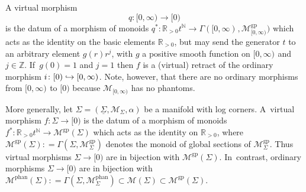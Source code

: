 \documentclass[10pt]{amsart}
\newcommand\hto{\mathrel{\lhook\joinrel\to}}
\theoremstyle{definition}
\theoremstyle{remark}
\newenvironment{example}
  {\pushQED{\qed}\renewcommand{\qedsymbol}{$\lozenge$}\examplex}
  {\popQED\endexamplex}
\newcommand{\RR}{\mathbb{R}}
\newcommand{\NN}{\mathbb{N}}
\newcommand{\ZZ}{\mathbb{Z}}
\newcommand{\halfspc}[1]{[0,\infty)^{#1}}
\newcommand{\defas}{\mathrel{\mathop:}=}
\newcommand{\cM}{\mathscr{M}}
\newcommand{\cMgp}{\mathscr{M}^{\mathrm{gp}}}
\newcommand{\cMphan}{\mathscr{M}^{\mathrm{phan}}}
\newcommand{\Sig}{\Sigma}
\newcommand{\uSig}{\underline{\Sigma}}
\newcommand{\sect}[1]{\mathsf{\Gamma}(#1)}
\begin{document}
\begin{example}\label{ex:weak-mor-retract-interval}
A virtual morphism
\[
q\colon \halfspc{}\to [0)
\]
is the datum of a morphism of monoids $q^*\colon \RR_{>0} t^{\NN}\to \sect{\halfspc{},\cMgp_{\halfspc{}}}$ which acts as the identity on the basic elements $\RR_{>0}$, but may send the generator $t$ to an arbitrary element $g(r)r^j$, with $g$ a positive smooth function on $\halfspc{}$ and $j\in\ZZ$. If~$g(0)=1$ and $j=1$ then $f$ is a (virtual) retract of the ordinary morphism $i\colon [0)\hto \halfspc{}$. Note, however, that there are no ordinary morphisms from $\halfspc{}$ to $[0)$ because $\cM_{\halfspc{}}$ has no phantoms.
\end{example}

\begin{example}
More generally, let $\Sig=(\uSig,\cM_\Sig,\alpha)$ be a manifold with log corners. A~virtual morphism $f:\Sig\to [0)$ is the datum of a morphism of monoids $f^*:\RR_{>0}t^\NN\to \cMgp(\Sig)$ which acts as the identity on $\RR_{>0}$, where $\cMgp(\Sig)\defas \sect{\Sig,\cMgp_\Sig}$ denotes the monoid of global sections of $\cMgp_\Sig$. Thus virtual morphisms $\Sig\to [0)$ are in bijection with $\cMgp(\Sig)$. In~contrast, ordinary morphisms $\Sig\to [0)$ are in bijection with $\cMphan(\Sig)\defas\sect{\Sig,\cMphan_\Sig} \subset \cM(\Sig)\subset \cMgp(\Sig)$.
\end{example}
\end{document}
